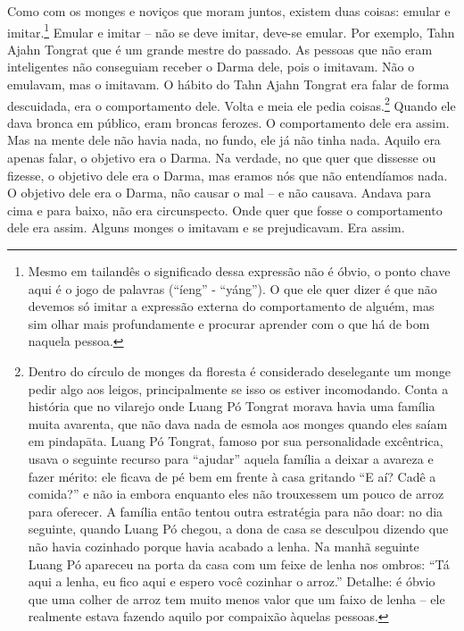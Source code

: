 Como com os monges e noviços que moram juntos, existem duas coisas:
emular e imitar.\footnote{Mesmo em tailandês o significado dessa
expressão não é óbvio, o ponto chave aqui é o jogo de palavras
(“íeng” - “yáng”). O que ele quer dizer é que não devemos só imitar a
expressão externa do comportamento de alguém, mas sim olhar mais
profundamente e procurar aprender com o que há de bom naquela pessoa.}
Emular e imitar – não se deve imitar, deve-se emular. Por exemplo, Tahn
Ajahn Tongrat que é um grande mestre do passado. As pessoas que não
eram inteligentes não conseguiam receber o Darma dele, pois o imitavam.
Não o emulavam, mas o imitavam. O hábito do Tahn Ajahn Tongrat era
falar de forma descuidada, era o comportamento dele. Volta e meia ele
pedia coisas.\footnote{Dentro do círculo de monges da floresta é
considerado deselegante um monge pedir algo aos leigos, principalmente
se isso os estiver incomodando. Conta a história que no vilarejo onde
Luang Pó Tongrat morava havia uma família muita avarenta, que não dava
nada de esmola aos monges quando eles saíam em pindapāta. Luang Pó
Tongrat, famoso por sua personalidade excêntrica, usava o seguinte
recurso para “ajudar” aquela família a deixar a avareza e fazer mérito:
ele ficava de pé bem em frente à casa gritando “E aí? Cadê a comida?” e
não ia embora enquanto eles não trouxessem um pouco de arroz para
oferecer. A família então tentou outra estratégia para não doar: no dia
seguinte, quando Luang Pó chegou, a dona de casa se desculpou dizendo
que não havia cozinhado porque havia acabado a lenha. Na manhã seguinte
Luang Pó apareceu na porta da casa com um feixe de lenha nos ombros:
“Tá aqui a lenha, eu fico aqui e espero você cozinhar o arroz.”
Detalhe: é óbvio que uma colher de arroz tem muito menos valor que um
faixo de lenha – ele realmente estava fazendo aquilo por compaixão
àquelas pessoas.} Quando ele dava bronca em público, eram broncas
ferozes. O comportamento dele era assim. Mas na mente dele não havia
nada, no fundo, ele já não tinha nada. Aquilo era apenas falar, o
objetivo era o Darma. Na verdade, no que quer que dissesse ou fizesse,
o objetivo dele era o Darma, mas eramos nós que não entendíamos nada. O
objetivo dele era o Darma, não causar o mal – e não causava. Andava
para cima e para baixo, não era circunspecto. Onde quer que fosse o
comportamento dele era assim. Alguns monges o imitavam e se
prejudicavam. Era assim.

